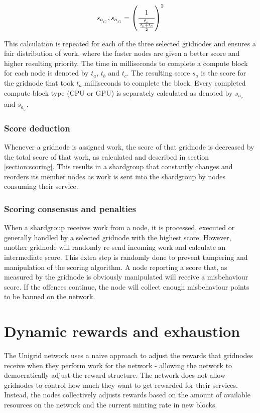 \documentclass[10pt,a4paper,final]{article}
\begin{document}
\[
	\begin{array}{l}
	s_{a_{_C}}, s_{a_{_G}} = \left( \cfrac{1}{\frac{t_a}{\frac{t_b + t_c}{2}}} \right) ^2\\
	\end{array}	
\]

\noindent This calculation is repeated for each of the three selected \glspl{gridnode} and ensures a fair distribution of work, where the faster nodes are given a better score and higher resulting priority. The time in milliseconds to complete a compute block for each node is denoted by $t_{a}$, $t_{b}$ and $t_{c}$. The resulting score $s_{a}$ is the score for the \gls{gridnode} that took $t_{a}$ milliseconds to complete the block. Every completed compute block type (CPU or GPU) is separately calculated as denoted by $s_{a_{_C}}$ and $s_{a_{_G}}$.

\subsubsection{Score deduction}
Whenever a \gls{gridnode} is assigned work, the score of that \gls{gridnode} is decreased by the total score of that work, as calculated and described in section \ref{section:scoring}. This results in a \gls{shardgroup} that constantly changes and reorders its member nodes as work is sent into the \gls{shardgroup} by nodes consuming their service.

\subsubsection{Scoring consensus and penalties}
\label{section:penalties}
When a \gls{shardgroup} receives work from a node, it is processed, executed or generally handled by a selected \gls{gridnode} with the highest score. However, another \gls{gridnode} will randomly re-send incoming work and calculate an intermediate score. This extra step is randomly done to prevent tampering and manipulation of the scoring algorithm. A node reporting a score that, as measured by the \gls{gridnode} is obviously manipulated will receive a misbehaviour score. If the offences continue, the node will collect enough misbehaviour points to be banned on the network.

\section{Dynamic rewards and exhaustion}
\label{section:dynreward}
The Unigrid network uses a naive approach to adjust the rewards that \glspl{gridnode} receive when they perform work for the network - allowing the network to democratically adjust the reward structure. The network does not allow \glspl{gridnode} to control how much they want to get rewarded for their services. Instead, the nodes collectively adjusts rewards based on the amount of available resources on the network and the current minting rate in new blocks.
\end{document}
